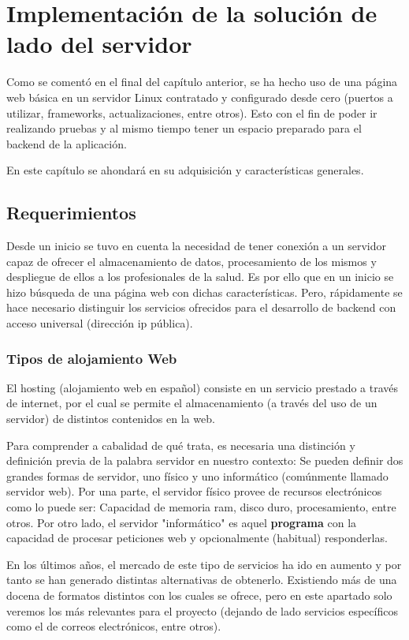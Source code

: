 \chapter{Implementación de la solución de lado del servidor}\label{servidor}
Como se comentó en el final del capítulo anterior, se ha hecho uso de una página web básica en un servidor Linux contratado y configurado desde cero (puertos a utilizar, frameworks, actualizaciones, entre otros). Esto con el fin de poder ir realizando pruebas y al mismo tiempo tener un espacio preparado para el backend de la aplicación. 

En este capítulo se ahondará en su adquisición y características generales.

\section{Requerimientos}
Desde un inicio se tuvo en cuenta la necesidad de tener conexión a un servidor capaz de ofrecer el almacenamiento de datos, procesamiento de los mismos y despliegue de ellos a los profesionales de la salud. Es por ello que en un inicio se hizo búsqueda de una página web con dichas características. Pero, rápidamente se hace necesario distinguir los servicios ofrecidos para el desarrollo de backend con acceso universal (dirección ip pública).

\subsection{Tipos de alojamiento Web}
El hosting\cite{hosting_web} (alojamiento web en español) consiste en un servicio prestado a través de internet, por el cual se permite el almacenamiento (a través del uso de un servidor) de distintos contenidos en la web.

\newpage
Para comprender a cabalidad de qué trata, es necesaria una distinción y definición previa de la palabra servidor en nuestro contexto: Se pueden definir dos grandes formas de servidor, uno físico y uno informático (comúnmente llamado servidor web).
Por una parte, el servidor físico provee de recursos electrónicos como lo puede ser: Capacidad de memoria ram, disco duro, procesamiento, entre otros. Por otro lado, el servidor "informático" es aquel \textbf{programa} con la capacidad de procesar peticiones web y opcionalmente (habitual) responderlas.

En los últimos años, el mercado de este tipo de servicios ha ido en aumento y por tanto se han generado distintas alternativas de obtenerlo. Existiendo más de una docena de formatos distintos con los cuales se ofrece, pero en este apartado solo veremos los más relevantes para el proyecto (dejando de lado servicios específicos como el de correos electrónicos, entre otros).

